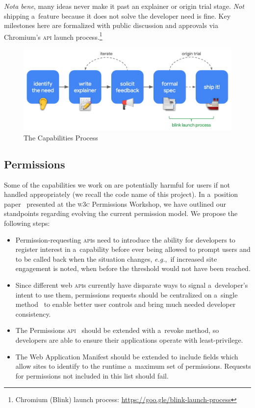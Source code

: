 \documentclass[sigconf]{acmart}
\begin{document}
\textit{Nota bene}, many ideas never make it past an explainer or origin trial stage.
\textit{Not} shipping a~feature because it does not solve the developer need is fine.
Key milestones here are formalized with public discussion and approvals
via Chromium's \textsc{api} launch process.\footnote{Chromium (Blink) launch process:
\url{https://goo.gle/blink-launch-process}}

\begin{figure}[htb]
  \includegraphics[trim={0 0.5cm 0 0},clip,width=0.925\columnwidth]{capabilities-process.jpg}
  \caption{The Capabilities Process}
  \label{fig:fuguprocess}
  \vspace{-0.65em}
\end{figure}

\subsection{Permissions}

Some of the capabilities we work on are potentially harmful for users
if not handled appropriately (we recall the code name of this project).
In a~position paper~\cite{russell18} presented at the \textsc{w3c} Permissions Workshop,
we have outlined our standpoints regarding evolving the current permission model.
We propose the following steps:

\begin{itemize}
  \item Permission-requesting \textsc{api}s need to introduce the ability for
    developers to register interest in a~capability before ever being allowed to prompt users
    and to be called back when the situation changes, \textit{e.g.},\
    if increased site engagement is noted, when before the threshold would not have been reached.
  \item Since different web \textsc{api}s currently have disparate ways to signal
    a~developer's intent to use them, permissions requests should be centralized
    on a~single method~\cite{yasskin17} to enable
    better user controls and bring much needed developer consistency.
  \item The Permissions \textsc{api}~\cite{lamouri19} should be extended with a~revoke method,
    so developers are able to ensure their applications operate with least-privilege.
  \item The Web Application Manifest should be extended to include fields
    which allow sites to identify to the runtime a~maximum set of permissions.
    Requests for permissions not included in this list should fail.
\end{itemize}
\end{document}
